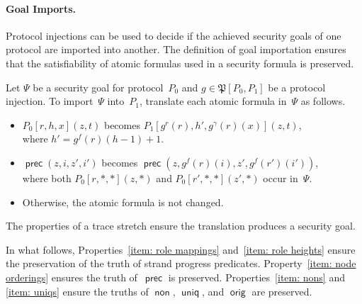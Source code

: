 \documentclass[12pt]{article}
\newcommand{\cn}[1]{\ensuremath{\operatorname{\mathsf{#1}}}}
\newcommand{\alg}[1]{\ensuremath{\mathfrak{#1}}}
\begin{document}
\paragraph{Goal Imports.}
Protocol injections can be used to decide if the achieved security
goals of one protocol are imported into another.  The definition of
goal importation ensures that the satisfiability of atomic formulas
used in a security formula is preserved.

Let $\Psi$ be a security goal for protocol~$P_0$ and
$g\in\alg{P}[P_0,P_1]$ be a protocol injection.  To import~$\Psi$
into~$P_1$, translate each atomic formula in~$\Psi$ as follows.
\begin{itemize}
\item $P_0[r,h,x](z, t)$ becomes
  $P_1[g^r(r),h',g^\gamma(r)(x)](z,t)$,\\ where $h'=g^f(r)(h-1)+1$.
\item $\cn{prec}(z,i,z',i')$ becomes
  $\cn{prec}(z,g^f(r)(i),z',g^f(r')(i'))$,\\ where both
  $P_0[r,\ast,\ast](z,\ast)$ and $P_0[r',\ast,\ast](z',\ast)$ occur
  in~$\Psi$.
\item Otherwise, the atomic formula is not changed.
\end{itemize}
The properties of a trace stretch ensure the translation produces a
security goal.

In what follows, Properties~\ref{item: role mappings} and~\ref{item:
  role heights} ensure the preservation of the truth of strand
progress predicates.  Property~\ref{item: node orderings} ensures the
truth of~$\cn{prec}$ is preserved.  Properties~\ref{item: nons} and
\ref{item: uniqs} ensure the truths of \cn{non}, \cn{uniq}, and
\cn{orig} are preserved.
\end{document}
